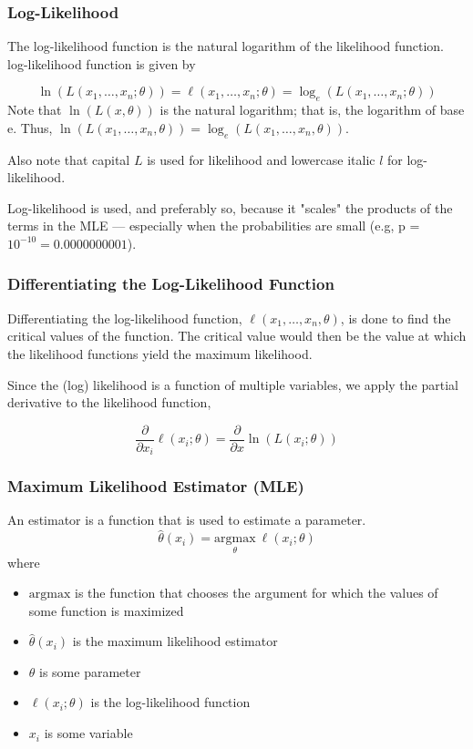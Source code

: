 \documentclass{article}
\begin{document}
\subsubsection{Log-Likelihood}
The log-likelihood function is the natural logarithm of the likelihood function. log-likelihood function is given by

$$ \ln(L(x_1, \dots, x_n; \theta)) = \ell(x_1, \dots, x_n; \theta) = \log_{e} ( L(x_1, \dots, x_n; \theta) ) $$ 
\hfill \break
Note that $ \ln(L(x, \theta)) $ is the natural logarithm; that is, the logarithm of base e. Thus, $ \ln(L(x_1, \dots, x_n, \theta)) = \log_{e} ( L(x_1, \dots, x_n, \theta) ) $.

Also note that capital $L$ is used for likelihood and lowercase italic $l$ for log-likelihood.

Log-likelihood is used, and preferably so, because it "scales" the products of the terms in the MLE — especially when the probabilities are small (e.g, p = $10^{-10} = 0.0000000001 $). 

\subsubsection{Differentiating the Log-Likelihood Function}
Differentiating the log-likelihood function, $\ell(x_1, \dots, x_n,\theta)$, is done to find the critical values of the function. The critical value would then be the value at which the likelihood functions yield the maximum likelihood.

Since the (log) likelihood is a function of multiple variables, we apply the partial derivative to the likelihood function,

$$ \frac{\partial}{\partial x_i} \ell(x_i; \theta) = \frac{\partial}{\partial x} \ln( L(x_i; \theta) ) $$

\subsubsection{Maximum Likelihood Estimator (MLE)}
An estimator is a function that is used to estimate a parameter.
$$ \hat{\theta}(x_i) = \underset{\theta}{\text{argmax}} \: \ell(x_i; \theta) $$
where \hfill \break
\begin{itemize}
    \item $\text{argmax}$ is the function that chooses the argument for which the values of some function is maximized
    \item $ \hat{\theta}(x_i) $ is the maximum likelihood estimator
    \item $ \theta $ is some parameter
    \item $  \ell(x_i; \theta) $ is the log-likelihood function
    \item $ x_i $ is some variable
\end{itemize}
\end{document}
